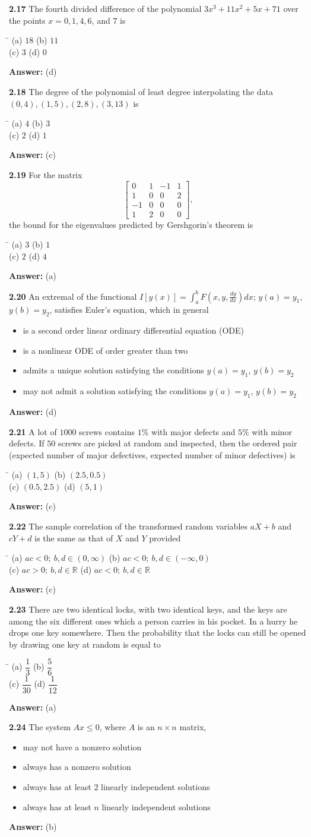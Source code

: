 \documentclass[11pt,a4paper]{article}
\newcommand{\optsfour}[4]{%
  \begin{tabbing}
    \hspace{0.48\linewidth}\=\kill
    (a) #1 \> (b) #2 \\[2pt]
    (c) #3 \> (d) #4
  \end{tabbing}%
}
\newcommand{\optslist}[4]{%
  \begin{itemize}
    \setlength{\itemsep}{2pt}\setlength{\parskip}{0pt}
    \item[(a)] #1
    \item[(b)] #2
    \item[(c)] #3
    \item[(d)] #4
  \end{itemize}%
}
\newcommand{\ans}[1]{\textbf{Answer:} #1\par\medskip}
\begin{document}
\textbf{2.17} The fourth divided difference of the polynomial $3x^3 + 11x^2 + 5x + 71$ over the points $x = 0, 1, 4, 6$, and $7$ is
\optsfour{$18$}{$11$}{$3$}{$0$}
\ans{(d)}

\textbf{2.18} The degree of the polynomial of least degree interpolating the data $(0, 4), (1, 5), (2, 8), (3, 13)$ is
\optsfour{$4$}{$3$}{$2$}{$1$}
\ans{(c)}

\textbf{2.19} For the matrix
\[
  \begin{bmatrix}
    0 & 1 & -1 & 1 \\
    1 & 0 & 0 & 2 \\
    -1 & 0 & 0 & 0 \\
    1 & 2 & 0 & 0
  \end{bmatrix},
\]
the bound for the eigenvalues predicted by Gershgorin's theorem is
\optsfour{$3$}{$1$}{$2$}{$4$}
\ans{(a)}

\textbf{2.20} An extremal of the functional $I[y(x)] = \displaystyle\int_a^b F\!\left(x, y, \frac{dy}{dx}\right)dx$; $y(a) = y_1$, $y(b) = y_2$, satisfies Euler's equation, which in general
\optslist{is a second order linear ordinary differential equation (ODE)}{is a nonlinear ODE of order greater than two}{admits a unique solution satisfying the conditions $y(a) = y_1$, $y(b) = y_2$}{may not admit a solution satisfying the conditions $y(a) = y_1$, $y(b) = y_2$}
\ans{(d)}

\textbf{2.21} A lot of $1000$ screws contains $1\%$ with major defects and $5\%$ with minor defects. If $50$ screws are picked at random and inspected, then the ordered pair (expected number of major defectives, expected number of minor defectives) is
\optsfour{$(1, 5)$}{$(2.5, 0.5)$}{$(0.5, 2.5)$}{$(5, 1)$}
\ans{(c)}

\textbf{2.22} The sample correlation of the transformed random variables $aX + b$ and $cY + d$ is the same as that of $X$ and $Y$ provided
\optsfour{$ac < 0;\ b, d \in (0, \infty)$}{$ac < 0;\ b, d \in (-\infty, 0)$}{$ac > 0;\ b, d \in \mathbb{R}$}{$ac < 0;\ b, d \in \mathbb{R}$}
\ans{(c)}

\textbf{2.23} There are two identical locks, with two identical keys, and the keys are among the six different ones which a person carries in his pocket. In a hurry he drops one key somewhere. Then the probability that the locks can still be opened by drawing one key at random is equal to
\optsfour{$\dfrac{1}{3}$}{$\dfrac{5}{6}$}{$\dfrac{1}{30}$}{$\dfrac{1}{12}$}
\ans{(a)}

\textbf{2.24} The system $Ax \le 0$, where $A$ is an $n \times n$ matrix,
\optslist{may not have a nonzero solution}{always has a nonzero solution}{always has at least $2$ linearly independent solutions}{always has at least $n$ linearly independent solutions}
\ans{(b)}
\end{document}
